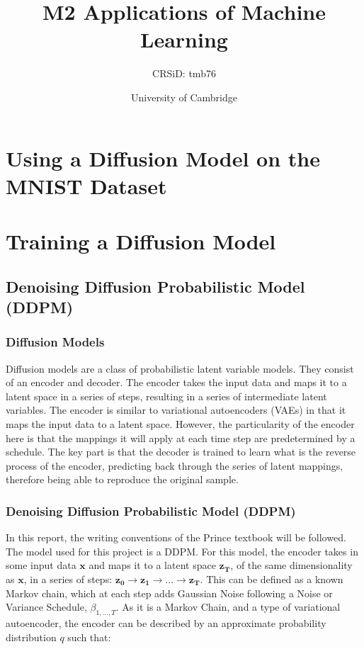 \documentclass[12pt]{report} %
\title{M2 Applications of Machine Learning}
\author{CRSiD: tmb76}
\date{University of Cambridge}
\begin{document}
\maketitle

\tableofcontents

\chapter*{Using a Diffusion Model on the MNIST Dataset}

\chapter{Training a Diffusion Model}

\section{Denoising Diffusion Probabilistic Model (DDPM)}

\subsection{Diffusion Models}

Diffusion models are a class of probabilistic latent variable models. They consist of an encoder and decoder. The encoder takes the input data and maps it to a latent space in a series of steps, resulting in a series of intermediate latent variables. The encoder is similar to variational autoencoders (VAEs) in that it maps the input data to a latent space. However, the particularity of the encoder here is that the mappings it will apply at each time step are predetermined by a schedule. The key part is that the decoder is trained to learn what is the reverse process of the encoder, predicting back through the series of latent mappings, therefore being able to reproduce the original sample\cite[p.348]{prince2023understanding}.

\subsection{Denoising Diffusion Probabilistic Model (DDPM)}

In this report, the writing conventions of the Prince textbook will be followed\cite{prince2023understanding}. The model used for this project is a DDPM. For this model, the encoder takes in some input data $\mathbf{x}$ and maps it to a latent space $\mathbf{z_{T}}$, of the same dimensionality as $\mathbf{x}$, in a series of steps: $\mathbf{z_{0}} \rightarrow \mathbf{z_{1}} \rightarrow \ldots \rightarrow \mathbf{z_{T}}$. This can be defined as a known Markov chain, which at each step adds Gaussian Noise following a Noise or Variance Schedule, $\beta_{1, \dots, T}$. As it is a Markov Chain, and a type of variational autoencoder, the encoder can be described by an approximate probability distribution $q$ such that\cite{ho2020denoising}:
\end{document}

